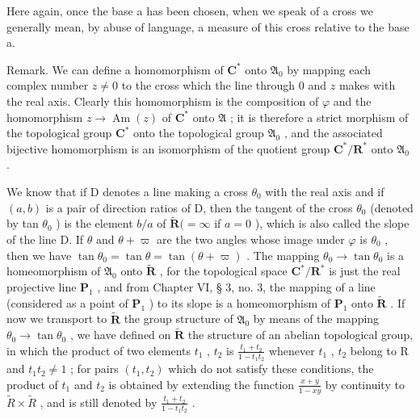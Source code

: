 Here again, once the base a has been chosen, when we speak of a cross we generally mean, by abuse of language, a measure of this cross relative to the base a.

Remark. We can define a homomorphism of \(\mathbf{C}^*\) onto \(\mathfrak{A}_0\) by mapping each complex number \(z \neq 0\) to the cross which the line through \(0\) and \(z\) makes with the real axis. Clearly this homomorphism is the composition of \(\varphi\) and the homomorphism \(z \to \operatorname{Am}(z)\) of \(\mathbf{C}^*\) onto \(\mathfrak{A}\) ; it is therefore a strict morphism of the topological group \(\mathbf{C}^*\) onto the topological group \(\mathfrak{A}_0\) , and the associated bijective homomorphism is an isomorphism of the quotient group \(\mathbf{C}^*/\mathbf{R}^*\) onto \(\mathfrak{A}_0\) .

We know that if D denotes a line making a cross \(\theta_0\) with the real axis and if \((a, b)\) is a pair of direction ratios of D, then the tangent of the cross \(\theta_0\) (denoted by tan \(\theta_0\) ) is the element \(b/a\) of \(\tilde{\mathbf{R}} (= \infty\) if \(a = 0\) ), which is also called the slope of the line D. If \(\theta\) and \(\theta + \varpi\) are the two angles whose image under \(\varphi\) is \(\theta_0\) , then we have \(\tan \theta_0 = \tan \theta = \tan (\theta + \varpi)\) . The mapping \(\theta_0 \to \tan \theta_0\) is a homeomorphism of \(\mathfrak{A}_0\) onto \(\tilde{\mathbf{R}}\) , for the topological space \(\mathbf{C}^*/\mathbf{R}^*\) is just the real projective line \(\mathbf{P}_1\) , and from Chapter VI, § 3, no. 3, the mapping of a line (considered as a point of \(\mathbf{P}_1\) ) to its slope is a homeomorphism of \(\mathbf{P}_1\) onto \(\tilde{\mathbf{R}}\) . If now we transport to \(\tilde{\mathbf{R}}\) the group structure of \(\mathfrak{A}_0\) by means of the mapping \(\theta_0 \to \tan \theta_0\) , we have defined on \(\tilde{\mathbf{R}}\) the structure of an abelian topological group, in which the product of two elements \(t_1\) , \(t_2\) is \(\frac{t_1 + t_2}{1 - t_1 t_2}\) whenever \(t_1\) , \(t_2\) belong to R and \(t_1 t_2 \neq 1\) ; for pairs \((t_1, t_2)\) which do not satisfy these conditions, the product of \(t_{1}\) and \(t_{2}\) is obtained by extending the function \(\frac{x+y}{1-xy}\) by continuity to \(\tilde{R}\times\tilde{R}\) , and is still denoted by \(\frac{t_{1}+t_{2}}{1-t_{1}t_{2}}\) .

